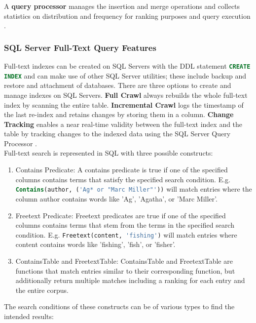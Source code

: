 A \textbf{query processor} manages the insertion and merge operations and collects statistics on distribution and frequency for ranking purposes and query execution \parencite[cf.][pp. 8-9]{hamilton_microsoft_2001}.
\subsubsection{SQL Server Full-Text Query Features}
Full-text indexes can be created on \ac{SQL} Servers with the \ac{DDL} statement \lstinline[language=SQL]$CREATE INDEX$ and can make use of other \ac{SQL} Server utilities; these include backup and restore and attachment of databases. There are three options to create and manage indexes on \ac{SQL} Servers. \textbf{Full Crawl} always rebuilds the whole full-text index by scanning the entire table. \textbf{Incremental Crawl} logs the timestamp of the last re-index and retains changes by storing them in a column. \textbf{Change Tracking} enables a near real-time validity between the full-text index and the table by tracking changes to the indexed data using the \ac{SQL} Server Query Processor \parencite[cf.][p. 9]{hamilton_microsoft_2001}.\\
Full-text search is represented in \ac{SQL} with three possible constructs: \parencite[cf.][p. 9]{hamilton_microsoft_2001}
\begin{enumerate}
    \item Contains Predicate: A contains predicate is true if one of the specified columns contains terms that satisfy the specified search condition. E.g. \lstinline[language=SQL]$Contains(author, ('Ag* or "Marc Miller"'))$ will match entries where the column author contains words like 'Ag', 'Agatha', or 'Marc Miller'.
    \item Freetext Predicate: Freetext predicates are true if one of the specified columns contains terms that stem from the terms in the specified search condition. E.g. \lstinline[language=SQL]$Freetext(content, 'fishing')$ will match entries where content contains words like 'fishing', 'fish', or 'fisher'.
    \item ContainsTable and FreetextTable: ContainsTable and FreetextTable are functions that match entries similar to their corresponding function, but additionally return multiple matches including a ranking for each entry and the entire corpus.
\end{enumerate}
The search conditions of these constructs can be of various types to find the intended results: \parencite[cf.][p. 9]{hamilton_microsoft_2001}
